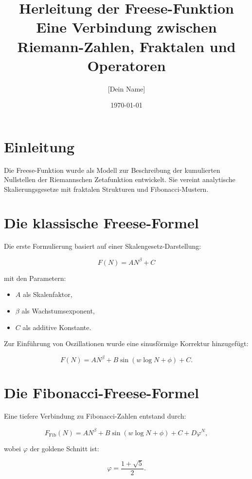 \documentclass[a4paper,12pt]{article}
\title{Herleitung der Freese-Funktion \\ Eine Verbindung zwischen Riemann-Zahlen, Fraktalen und Operatoren}
\author{[Dein Name]}
\date{\today}
\begin{document}
\maketitle

\section{Einleitung}
Die Freese-Funktion wurde als Modell zur Beschreibung der kumulierten Nullstellen der Riemannschen Zetafunktion entwickelt. Sie vereint analytische Skalierungsgesetze mit fraktalen Strukturen und Fibonacci-Mustern.

\section{Die klassische Freese-Formel}
Die erste Formulierung basiert auf einer Skalengesetz-Darstellung:

\begin{equation}
F(N) = A N^\beta + C
\end{equation}

mit den Parametern:
\begin{itemize}
    \item \( A \) als Skalenfaktor,
    \item \( \beta \) als Wachstumsexponent,
    \item \( C \) als additive Konstante.
\end{itemize}

Zur Einführung von Oszillationen wurde eine sinusförmige Korrektur hinzugefügt:

\begin{equation}
F(N) = A N^\beta + B \sin(w \log N + \phi) + C.
\end{equation}

\section{Die Fibonacci-Freese-Formel}
Eine tiefere Verbindung zu Fibonacci-Zahlen entstand durch:

\begin{equation}
F_{\text{Fib}}(N) = A N^\beta + B \sin(w \log N + \phi) + C + D \varphi^N,
\end{equation}

wobei \(\varphi\) der goldene Schnitt ist:

\begin{equation}
\varphi = \frac{1 + \sqrt{5}}{2}.
\end{equation}
\end{document}
